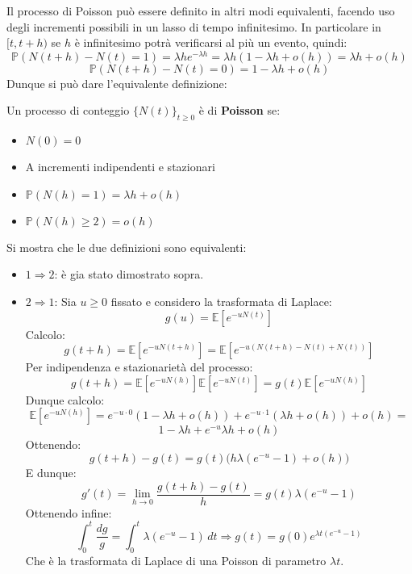 Il processo di Poisson può essere definito in altri modi equivalenti, facendo uso degli incrementi possibili in un lasso di tempo infinitesimo. In particolare in $[t,t+h)$ se $h$ è infinitesimo potrà verificarsi al più un evento, quindi:
\[\mathbb{P}(N(t+h)-N(t)=1)=\lambda he^{-\lambda h}=\lambda h(1-\lambda h + o(h))=\lambda h + o(h)\]
\[\mathbb{P}(N(t+h)-N(t)=0)=1-\lambda h+o(h)\]
Dunque si può dare l'equivalente definizione:
\begin{definition}[Poisson 2]
Un processo di conteggio $\{N(t)\}_{t\geq0}$ è di \newline \textbf{Poisson} se:
\begin{itemize}
    \item $N(0)=0$
    \item A incrementi indipendenti e stazionari
    \item $\mathbb{P}(N(h)=1)=\lambda h+o(h)$
    \item $\mathbb{P}(N(h)\geq2)=o(h)$
\end{itemize}
\end{definition}
Si mostra che le due definizioni sono equivalenti:
\begin{itemize}
    \item $1\Rightarrow 2$: è gia stato dimostrato sopra.
    \item $2\Rightarrow 1$: Sia $u\geq0$ fissato e considero la trasformata di Laplace:
    \[g(u)=\mathbb{E}\left[e^{-uN(t)}\right]\]
    Calcolo:
    \[g(t+h)=\mathbb{E}\left[e^{-uN(t+h)}\right]=\mathbb{E}\left[e^{-u(N(t+h)-N(t)+N(t))}\right]\]
    Per indipendenza e stazionarietà del processo:
    \[g(t+h)=\mathbb{E}\left[e^{-uN(h)}\right]\mathbb{E}\left[e^{-uN(t)}\right]=g(t)\mathbb{E}\left[e^{-uN(h)}\right]\]
    Dunque calcolo:
    \[\mathbb{E}\left[e^{-uN(h)}\right]=e^{-u\cdot0}(1-\lambda h +o(h))+e^{-u\cdot 1}(\lambda h+o(h))+o(h)=\]
    \[1-\lambda h+e^{-u}\lambda h+ o(h)\]
    Ottenendo:
    \[g(t+h)-g(t)=g(t)\big(h\lambda(e^{-u}-1)+o(h)\big)\]
    E dunque:
    \[g'(t)=\lim_{h\to0}\frac{g(t+h)-g(t)}{h}=g(t)\lambda(e^{-u}-1)\]
    Ottenendo infine:
    \[\int_0^t\frac{dg}{g}=\int_0^t\lambda(e^{-u}-1) \,dt \Rightarrow g(t)=g(0)e^{\lambda t(e^{-u}-1)}\]
    Che è la trasformata di Laplace di una Poisson di parametro $\lambda t$.
\end{itemize}
